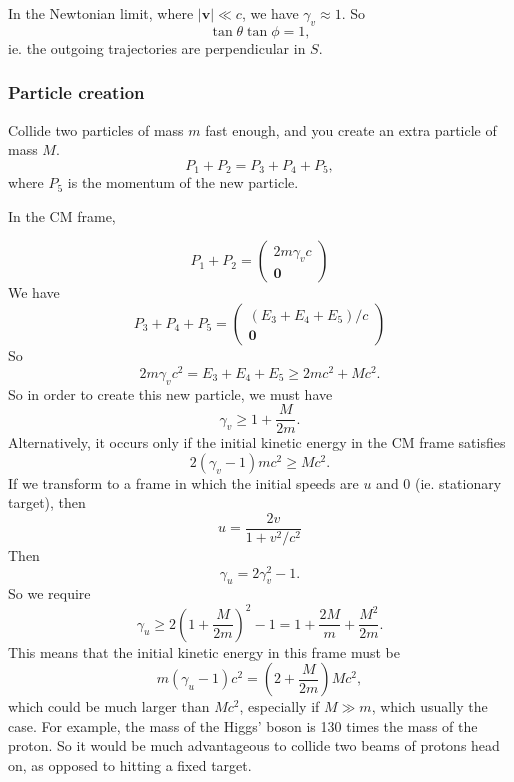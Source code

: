 \documentclass[a4paper]{article}
\begin{document}
In the Newtonian limit, where $|\mathbf{v}| \ll c$, we have $\gamma_v \approx 1$. So
\[
  \tan \theta\tan \phi = 1,
\]
ie. the outgoing trajectories are perpendicular in $S$.

\subsubsection*{Particle creation}
Collide two particles of mass $m$ fast enough, and you create an extra particle of mass $M$.
\[
  P_1 + P_2 = P_3 + P_4 + P_5,
\]
where $P_5$ is the momentum of the new particle.

In the CM frame,
\begin{center}
\end{center}
\[
  P_1 + P_2 =
  \begin{pmatrix}
    2m\gamma_v c\\
    \mathbf{0}
  \end{pmatrix}
\]
We have
\[
  P_3 + P_4 + P_5 =
  \begin{pmatrix}
    (E_3 + E_4 + E_5)/c\\
    \mathbf{0}
  \end{pmatrix}
\]
So
\[
  2m\gamma_v c^2 = E_3 + E_4 + E_5 \geq 2mc^2 + Mc^2.
\]
So in order to create this new particle, we must have
\[
  \gamma_v \geq 1 + \frac{M}{2m}.
\]
Alternatively, it occurs only if the initial kinetic energy in the CM frame satisfies
\[
  2(\gamma_v - 1)mc^2 \geq Mc^2.
\]
If we transform to a frame in which the initial speeds are $u$ and 0 (ie. stationary target), then
\[
  u = \frac{2v}{1 + v^2/c^2}
\]
Then
\[
  \gamma_u = 2\gamma_v^2 - 1.
\]
So we require
\[
  \gamma_u \geq 2\left(1 + \frac{M}{2m}\right)^2 - 1 = 1 + \frac{2M}{m} + \frac{M^2}{2m}.
\]
This means that the initial kinetic energy in this frame must be
\[
  m(\gamma_u - 1)c^2 = \left(2 + \frac{M}{2m}\right)Mc^2,
\]
which could be much larger than $Mc^2$, especially if $M\gg m$, which usually the case. For example, the mass of the Higgs' boson is 130 times the mass of the proton. So it would be much advantageous to collide two beams of protons head on, as opposed to hitting a fixed target.
\end{document}
